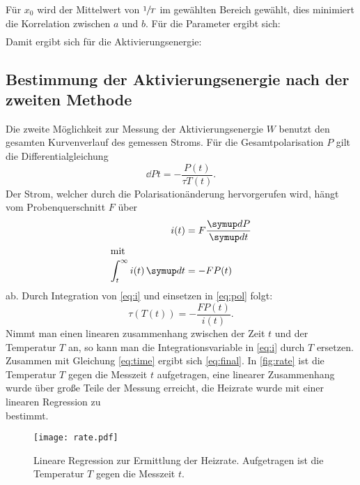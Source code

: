 Für $x_0$ wird der Mittelwert von $\sfrac{1}{T}$ im gewählten Bereich gewählt, dies minimiert die Korrelation zwischen $a$ und $b$.
Für die Parameter ergibt sich:
\begin{align}
  
\end{align}
Damit ergibt sich für die Aktivierungsenergie:
\begin{equation}
  
\end{equation}

\subsection{Bestimmung der Aktivierungsenergie nach der zweiten Methode}
Die zweite Möglichkeit zur Messung der Aktivierungsenergie $W$ benutzt den gesamten Kurvenverlauf des gemessen Stroms.
Für die Gesamtpolarisation $P$ gilt die Differentialgleichung
\begin{equation}
  \dd{P}{t} = - \frac{P(t)}{\tau{T(t)}}.
  \label{eq:pol}
\end{equation}
Der Strom, welcher durch die Polarisationänderung hervorgerufen wird, hängt vom Probenquerschnitt $F$ über
\begin{align}
  i(t) &= F \dd{P}{t} \\
  \shortintertext{mit}
  \int_t^{\infty} i(t) \dif{t} &= -FP(t)
  \label{eq:i}
\end{align}
ab.
Durch Integration von  \eqref{eq:i} und einsetzen in \eqref{eq:pol} folgt:
\begin{equation}
  \tau(T(t)) = -\frac{F P(t)}{i(t)}.
  \label{eq:tau_t}
\end{equation}
Nimmt man einen linearen zusammenhang zwischen der Zeit $t$ und der Temperatur $T$ an, so kann man die Integrationsvariable in \eqref{eq:i} durch $T$ ersetzen.
Zusammen mit Gleichung \eqref{eq:time} ergibt sich \eqref{eq:final}.
In \autoref{fig:rate} ist die Temperatur $T$ gegen die Messzeit $t$ aufgetragen, eine linearer Zusammenhang wurde über große Teile der
Messung erreicht, die Heizrate wurde mit einer linearen Regression
zu
\begin{equation}
  
\end{equation}
bestimmt.

\begin{figure}
  \centering
  \texttt{[image: rate.pdf]}
  \caption{Lineare Regression zur Ermittlung der Heizrate. Aufgetragen ist die Temperatur $T$ gegen die Messzeit $t$.}
  \label{fig:rate}
\end{figure}


